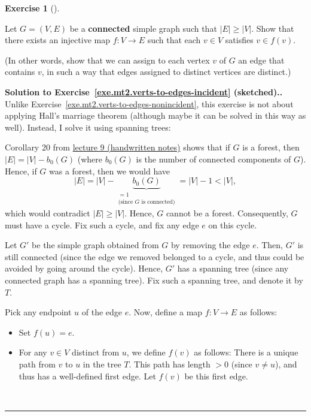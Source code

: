 \documentclass[numbers=enddot,12pt,final,onecolumn,notitlepage]{scrartcl}%
\newcounter{exer}
\theoremstyle{definition}
\newtheorem{exmp}[exer]{Exercise}
\newenvironment{exercise}[1][]
{\begin{exmp}[#1]\begin{leftbar}}
{\end{leftbar}\end{exmp}}
\newenvironment{proof}[1][Proof]{\noindent\textbf{#1.} }{\ \rule{0.5em}{0.5em}}
\newcommand{\abs}[1]{\left| #1 \right|}
\newcommand{\tup}[1]{\left( #1 \right)}
\newcommand{\underbrack}[2]{\underbrace{#1}_{\substack{#2}}}
\begin{document}
\begin{exercise} \label{exe.mt2.verts-to-edges-incident}
Let $G = \tup{V, E}$ be a \textbf{connected} simple graph such that
$\abs{E} \geq \abs{V}$.
Show that there exists an injective map $f : V \to E$ such that each
$v \in V$ satisfies $v \in f\tup{v}$.

(In other words, show that we can assign to each vertex $v$ of $G$
an edge that contains $v$, in such a way that edges assigned
to distinct vertices are distinct.)
\end{exercise}

\begin{proof}[Solution to
Exercise~\ref{exe.mt2.verts-to-edges-incident} (sketched).]
Unlike Exercise~\ref{exe.mt2.verts-to-edges-nonincident}, this
exercise is not about applying Hall's marriage theorem (although maybe
it can be solved in this way as well).
Instead, I solve it using spanning trees:

Corollary 20 from
\href{http://www.cip.ifi.lmu.de/~grinberg/t/17s/5707lec9.pdf}{lecture 9 (handwritten notes)}
shows that if $G$ is a forest, then $\abs{E} = \abs{V} - b_0 \tup{G}$
(where $b_0 \tup{G}$ is the number of connected components of $G$).
Hence, if $G$ was a forest, then we would have
\[
\abs{E} = \abs{V} - \underbrack{b_0 \tup{G}}
                               {= 1 \\ \text{(since } G
                                    \text{ is connected)}}
= \abs{V} - 1 < \abs{V} ,
\]
which would contradict $\abs{E} \geq \abs{V}$.
Hence, $G$ cannot be a forest.
Consequently, $G$ must have a cycle.
Fix such a cycle, and fix any edge $e$ on this cycle.

Let $G'$ be the simple graph obtained from $G$ by removing the edge
$e$.
Then, $G'$ is still connected (since the edge we removed belonged to
a cycle, and thus could be avoided by going around the cycle).
Hence, $G'$ has a spanning tree (since any connected graph has a
spanning tree).
Fix such a spanning tree, and denote it by $T$.

Pick any endpoint $u$ of the edge $e$.
Now, define a map $f : V \to E$ as follows:
\begin{itemize}
\item Set $f \tup{u} = e$.
\item For any $v \in V$ distinct from $u$, we define $f \tup{v}$ as
      follows:
      There is a unique path from $v$ to $u$ in the tree $T$.
      This path has length $> 0$ (since $v \neq u$), and thus has a
      well-defined first edge.
      Let $f \tup{v}$ be this first edge.
\end{itemize}


\end{proof}
\end{document}
